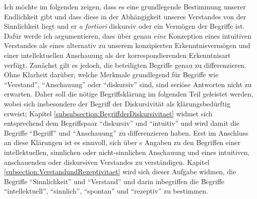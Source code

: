 Ich möchte im folgenden zeigen, dass es eine
grundlegende Bestimmung unserer Endlichkeit gibt und dass diese in der
Abhängigkeit unseres Verstandes von der Sinnlichkeit liegt und er \emph{a
fortiori} diskursiv oder ein Vermögen der Begriffe ist. Dafür werde ich
argumentieren, dass  über genau \emph{eine} Konzeption
eines intuitiven Verstandes als eines alternativ zu unserem konzipierten
Erkenntnisvermögen und einer intellektuellen Anschauung als der
korrespondierenden Erkenntnisart verfügt. Zunächst gilt es jedoch, die
beteiligten Begriffe genau zu differenzieren. Ohne Klarheit darüber, welche
Merkmale grundlegend für Begriffe wie \enquote{Verstand}, \enquote{Anschauung}
oder \enquote{diskursiv} sind, sind seriöse Antworten nicht zu erwarten. Daher
soll die nötige Begriffsklärung im folgenden Teil geleistet werden, wobei sich
insbesondere der Begriff der Diskursivität als klärungsbedürftig erweist; Kapitel
\ref{subsubsection:BegriffderDiskursivitaet} widmet sich entsprechend dem
Begriffspaar \enquote{diskursiv} und \enquote{intuitiv} und wird damit die
Begriffe \enquote{Begriff} und \enquote{Anschauung} zu differenzieren haben.
Erst im Anschluss an diese Klärungen ist es sinnvoll, sich über s Angaben zu den
Begriffen einer intellektuellen, sinnlichen oder nicht-sinnlichen Anschauung und
eines intuitiven, anschauenden oder diskursiven Verstandes zu verständigen.
Kapitel \ref{subsection:VerstandundRezeptivitaet} wird
sich dieser Aufgabe widmen, die Begriffe \enquote{Sinnlichkeit} und \enquote{Verstand} und
darin inbegriffen die Begriffe \enquote{intellektuell}, \enquote{sinnlich},
\enquote{spontan} und \enquote{rezeptiv} zu bestimmen.

